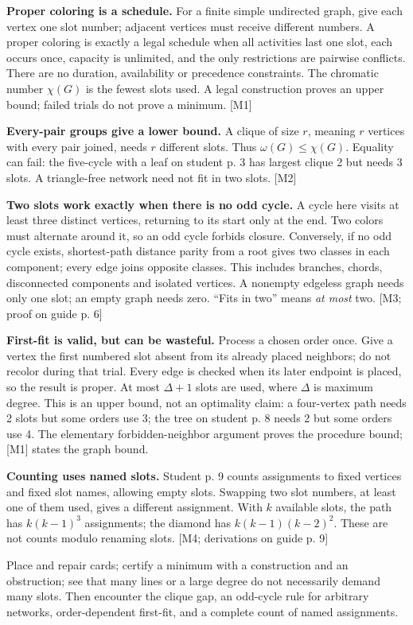 \documentclass[10pt,letterpaper]{article}
\newcommand{\topic}[1]{\vspace{3pt}{\large\bfseries #1}\par}
\newcommand{\labelled}[2]{\textbf{#1} #2\par}
\begin{document}
\topic{Mathematical destination}
\labelled{Proper coloring is a schedule.}{For a finite simple undirected graph, give each vertex one slot number; adjacent vertices must receive different numbers. A proper coloring is exactly a legal schedule when all activities last one slot, each occurs once, capacity is unlimited, and the only restrictions are pairwise conflicts. There are no duration, availability or precedence constraints. The chromatic number \(\chi(G)\) is the fewest slots used. A legal construction proves an upper bound; failed trials do not prove a minimum. [M1]}
\labelled{Every-pair groups give a lower bound.}{A clique of size \(r\), meaning \(r\) vertices with every pair joined, needs \(r\) different slots. Thus \(\omega(G)\leq\chi(G)\). Equality can fail: the five-cycle with a leaf on student p. 3 has largest clique 2 but needs 3 slots. A triangle-free network need not fit in two slots. [M2]}
\labelled{Two slots work exactly when there is no odd cycle.}{A cycle here visits at least three distinct vertices, returning to its start only at the end. Two colors must alternate around it, so an odd cycle forbids closure. Conversely, if no odd cycle exists, shortest-path distance parity from a root gives two classes in each component; every edge joins opposite classes. This includes branches, chords, disconnected components and isolated vertices. A nonempty edgeless graph needs only one slot; an empty graph needs zero. ``Fits in two'' means \emph{at most} two. [M3; proof on guide p. 6]}
\labelled{First-fit is valid, but can be wasteful.}{Process a chosen order once. Give a vertex the first numbered slot absent from its already placed neighbors; do not recolor during that trial. Every edge is checked when its later endpoint is placed, so the result is proper. At most \(\Delta+1\) slots are used, where \(\Delta\) is maximum degree. This is an upper bound, not an optimality claim: a four-vertex path needs 2 slots but some orders use 3; the tree on student p. 8 needs 2 but some orders use 4. The elementary forbidden-neighbor argument proves the procedure bound; [M1] states the graph bound.}
\labelled{Counting uses named slots.}{Student p. 9 counts assignments to fixed vertices and fixed slot names, allowing empty slots. Swapping two slot numbers, at least one of them used, gives a different assignment. With \(k\) available slots, the path has \(k(k-1)^3\) assignments; the diamond has \(k(k-1)(k-2)^2\). These are not counts modulo renaming slots. [M4; derivations on guide p. 9]}
\topic{What children are meant to discover}
Place and repair cards; certify a minimum with a construction and an obstruction; see that many lines or a large degree do not necessarily demand many slots. Then encounter the clique gap, an odd-cycle rule for arbitrary networks, order-dependent first-fit, and a complete count of named assignments.
\end{document}
